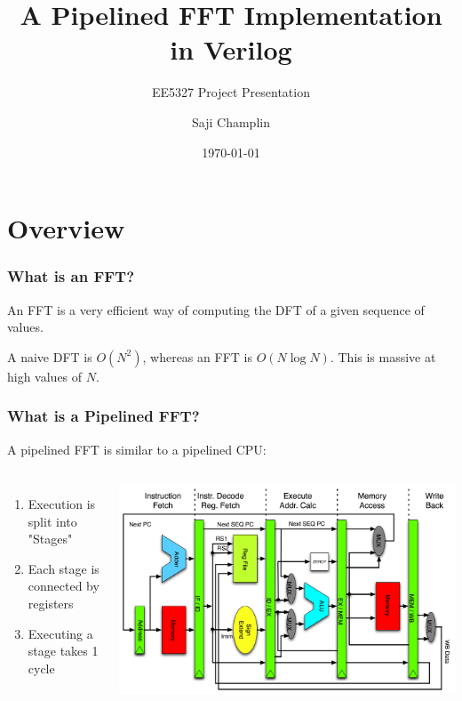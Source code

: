 \documentclass{beamer}
\title[Pipelined FFT]{A Pipelined FFT Implementation in Verilog}
\author{Saji Champlin}
\institute{University of Minnesota}
\date{\today}
\subtitle{EE5327 Project Presentation}
\begin{document}
\frame{\titlepage}

\section{Overview}

\begin{frame}
	\frametitle{What is an FFT?}

	An FFT is a very efficient way of computing the DFT of a given sequence of values.

	A naive DFT is $O(N^2)$, whereas an FFT is $O(N \log{N})$. This is massive at high
	values of $N$.

\end{frame}

\begin{frame}
	\frametitle{What is a Pipelined FFT?}
	A pipelined FFT is similar to a pipelined CPU:
	\begin{columns}
		\begin{enumerate}
			\item Execution is split into "Stages"
			\pause
			\item Each stage is connected by registers
			\pause
			\item Executing a stage takes 1 cycle
		\end{enumerate}
		\onslide
		\centering
		\includegraphics[width=\linewidth]{Pipeline_MIPS.png}
	\end{columns}

\end{frame}
\end{document}
